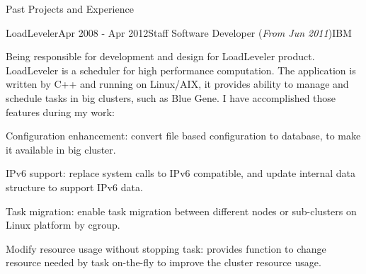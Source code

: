 \documentclass{resume} %
\newcommand{\http}{http:/\hspace{-0.3ex}/}
\begin{document}
\begin{rSection}{Past Projects and Experience}
%
%


\begin{rSubsection}{LoadLeveler}{Apr 2008 - Apr 2012}{Staff Software Developer (\textit{From Jun 2011})}{IBM}

Being responsible for development and design for LoadLeveler product. LoadLeveler is a scheduler for high performance computation. The application is written by C++ and running on Linux/AIX, it provides ability to manage and schedule tasks in big clusters, such as Blue Gene. I have accomplished those features during my work:

\begin{rSubsectionList}
\item Configuration enhancement: convert file based configuration to database, to make it available in big cluster.
\item IPv6 support: replace system calls to IPv6 compatible, and update internal data structure to support IPv6 data.
\item Task migration: enable task migration between different nodes or sub-clusters on Linux platform by cgroup.
\item Modify resource usage without stopping task: provides function to change resource needed by task on-the-fly to improve the cluster resource usage.
\end{rSubsectionList}\vspace{-1.5em}


\end{rSubsection}
\end{rSection}
\end{document}
